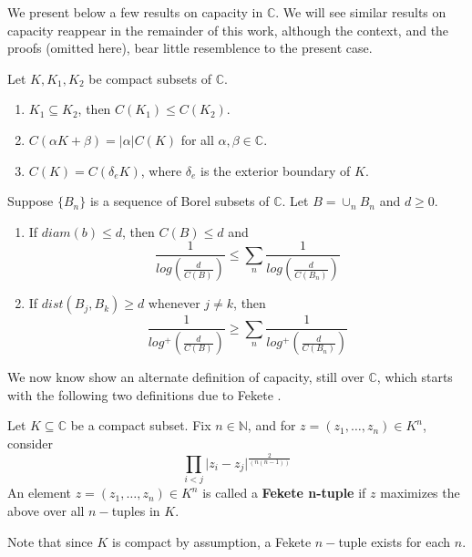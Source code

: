 We present below a few results on capacity in $\mathbb{C}$. We will see similar results on capacity reappear in the remainder of this work, although the context, and the proofs (omitted here), bear little resemblence to the present case.\\ 

\begin{proposition}
 Let $K,  K_1,K_2$ be compact subsets of $\mathbb{C}$.
\begin{enumerate}
\item $K_1 \subseteq K_2$, then $C(K_1) \leq C(K_2)$.
\item $C(\alpha K + \beta) = \lvert \alpha \rvert C(K)$ for all $\alpha, \beta \in \mathbb{C}$.
\item $C(K) = C(\delta_eK)$, where $\delta_e$ is the exterior boundary of $K$.
\end{enumerate}
\end{proposition}

\begin{proposition}
Suppose $\{B_n\}$ is a sequence of Borel subsets of $\mathbb{C}$. Let $B=\cup_n B_n$ and $d \geq 0$. 
\begin{enumerate}
\item If $diam(b) \leq d$, then $C(B) \leq d$ and \[\frac{1}{log(\frac{d}{C(B)})} \leq \sum_n \frac{1}{log(\frac{d}{C(B_n)})}\]
\item If $dist(B_j, B_k) \geq d$ whenever $j \neq k$, then \[\frac{1}{log^+(\frac{d}{C(B)})} \geq \sum_n \frac{1}{log^+(\frac{d}{C(B_n)})}\]
\end{enumerate}
\end{proposition}

We now know show an alternate definition of capacity, still over $\mathbb{C}$, which starts with the following two definitions due to Fekete \cite{fek}.\\ 

\begin{definition}
Let $K \subseteq \mathbb{C}$ be a compact subset. Fix $n \in \mathbb{N}$, and for $z = (z_1,\ldots,z_n) \in K^n$, consider
\[\prod_{i < j} \lvert z_i - z_j \rvert^{\frac{2}{(n(n-1))}} \]
An element $z = (z_1,\ldots,z_n) \in K^n$ is called a \textbf{Fekete n-tuple} if $z$ maximizes the above over all $n-$tuples in $K$.
\end{definition}

Note that since $K$ is compact by assumption, a Fekete $n-$tuple exists for each $n$.\\

